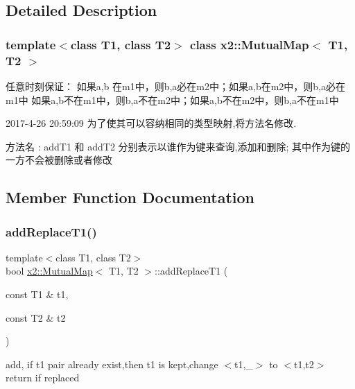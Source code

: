 \subsection{Detailed Description}
\subsubsection*{template$<$class T1, class T2$>$\newline
class x2\+::\+Mutual\+Map$<$ T1, T2 $>$}

任意时刻保证： 如果a,b 在m1中，则b,a必在m2中；如果a,b在m2中，则b,a必在m1中 如果a,b不在m1中，则b,a不在m2中；如果a,b不在m2中，则b,a不在m1中

2017-\/4-\/26 20\+:59\+:09 为了使其可以容纳相同的类型映射,将方法名修改.

方法名 \+: add\+T1 和 add\+T2 分别表示以谁作为键来查询,添加和删除; 其中作为键的一方不会被删除或者修改 

\subsection{Member Function Documentation}
\mbox{\label{classx2_1_1_mutual_map_adcf6a37d18e6db2939cb205c73ca9b72}} 
\subsubsection{\texorpdfstring{add\+Replace\+T1()}{addReplaceT1()}}
{\footnotesize\ttfamily template$<$class T1, class T2$>$ \\
bool \hyperlink{classx2_1_1_mutual_map}{x2\+::\+Mutual\+Map}$<$ T1, T2 $>$\+::add\+Replace\+T1 (\begin{DoxyParamCaption}\item[{const T1 \&}]{t1,  }\item[{const T2 \&}]{t2 }\end{DoxyParamCaption})\hspace{0.3cm}{\ttfamily [inline]}}

add, if t1 pair already exist,then t1 is kept,change $<$t1,\+\_\+$>$ to $<$t1,t2$>$ return if replaced \mbox{\label{classx2_1_1_mutual_map_ac9572b3e52982e24e77978ee7e3ab44b}} 
